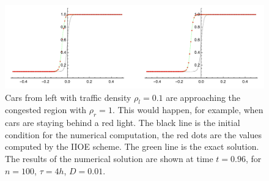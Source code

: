 \documentclass[../include.tex]{subfiles}
\begin{document}
\begin{figure}[h!]
	\centering
	\includegraphics[width=.99\textwidth]{figures/travelTraffic_100_4h}
	\caption{Cars from left with traffic density $ \rho_l = 0.1 $ are approaching the congested region with $ \rho_r = 1 $. This would happen, for example, when cars are staying behind a red light. 
		The black line is the initial condition for the numerical computation, the red dots are the values computed by the IIOE scheme. The green line is the exact solution. The results of the numerical solution are shown at time $ t = 0.96 $, for $ n = 100 $, $ \tau = 4h $, $ D = 0.01 $.
	}
	\label{fig:traffic_travel}
\end{figure}
\end{document}
